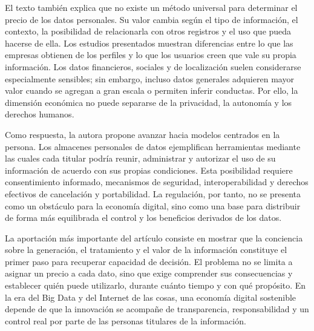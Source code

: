 El texto también explica que no existe un método universal para determinar el
precio de los datos personales. Su valor cambia según el tipo de información,
el contexto, la posibilidad de relacionarla con otros registros y el uso que
pueda hacerse de ella. Los estudios presentados muestran diferencias entre lo
que las empresas obtienen de los perfiles y lo que los usuarios creen que vale
su propia información. Los datos financieros, sociales y de localización suelen
considerarse especialmente sensibles; sin embargo, incluso datos generales
adquieren mayor valor cuando se agregan a gran escala o permiten inferir
conductas. Por ello, la dimensión económica no puede separarse de la privacidad,
la autonomía y los derechos humanos.

Como respuesta, la autora propone avanzar hacia modelos centrados en la persona.
Los almacenes personales de datos ejemplifican herramientas mediante las cuales
cada titular podría reunir, administrar y autorizar el uso de su información de
acuerdo con sus propias condiciones. Esta posibilidad requiere consentimiento
informado, mecanismos de seguridad, interoperabilidad y derechos efectivos de
cancelación y portabilidad. La regulación, por tanto, no se presenta como un
obstáculo para la economía digital, sino como una base para distribuir de forma
más equilibrada el control y los beneficios derivados de los datos.

La aportación más importante del artículo consiste en mostrar que la conciencia
sobre la generación, el tratamiento y el valor de la información constituye el
primer paso para recuperar capacidad de decisión. El problema no se limita a
asignar un precio a cada dato, sino que exige comprender sus consecuencias y
establecer quién puede utilizarlo, durante cuánto tiempo y con qué propósito. En
la era del Big Data y del Internet de las cosas, una economía digital sostenible
depende de que la innovación se acompañe de transparencia, responsabilidad y un
control real por parte de las personas titulares de la información.
